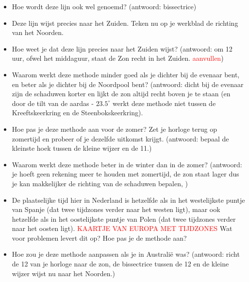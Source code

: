 \begin{itemize}
 \item Hoe wordt deze lijn ook wel genoemd? (antwoord: bissectrice)
 \item Deze lijn wijst precies naar het Zuiden. Teken nu op je werkblad de richting van het Noorden.
 \item Hoe weet je dat deze lijn precies naar het Zuiden wijst? (antwoord: om 12 uur, ofwel het middaguur, staat de Zon recht in het Zuiden. \textcolor{red}{aanvullen})
 \item Waarom werkt deze methode minder goed als je dichter bij de evenaar bent, en beter als je dichter bij de Noordpool bent? (antwoord: dicht bij de evenaar zijn de schaduwen korter en lijkt de zon altijd recht boven je te staan (en door de tilt van de aardas - $23.5^{\circ}$ werkt deze methode niet tussen de Kreeftskeerkring en de Steenbokskeerkring). 
 \item Hoe pas je deze methode aan voor de zomer? Zet je horloge terug op zomertijd en probeer of je dezelfde uitkomst krijgt. (antwoord: bepaal de kleinste hoek tussen de kleine wijzer en de 11.)
 \item Waarom werkt deze methode beter in de winter dan in de zomer? (antwoord: je hoeft geen rekening meer te houden met zomertijd, de zon staat lager dus je kan makkelijker de richting van de schaduwen bepalen, )
 \item De plaatselijke tijd hier in Nederland is hetzelfde als in het westelijkste puntje van Spanje (dat twee tijdzones verder naar het westen ligt), maar ook hetzelfde als in het oostelijkste puntje van Polen (dat twee tijdzones verder naar het oosten ligt). \textcolor{red}{KAARTJE VAN EUROPA MET TIJDZONES} Wat voor problemen levert dit op? Hoe pas je de methode aan?
 \item Hoe zou je deze methode aanpassen als je in Australi\"{e} was? (antwoord: richt de 12 van je horloge naar de zon, de bissectrice tussen de 12 en de kleine wijzer wijst nu naar het Noorden.)
\end{itemize}